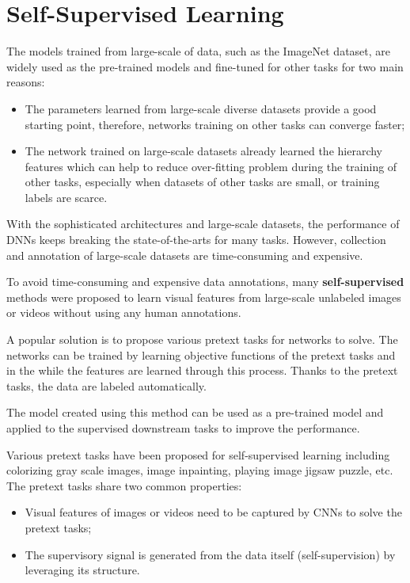 \chapter{Self-Supervised Learning}
The models trained from large-scale of data, such as the ImageNet dataset, are
widely used as the pre-trained models and fine-tuned for other tasks for two main
reasons:
\begin{itemize}
      \item The parameters learned from large-scale diverse datasets provide a
            good starting point, therefore, networks training on other tasks can
            converge faster;
      \item The network trained on large-scale datasets already learned the hierarchy
            features which can help to reduce over-fitting problem during the
            training of other tasks, especially when datasets of other tasks are
            small, or training labels are scarce.
\end{itemize}

With the sophisticated architectures and large-scale datasets, the performance
of DNNs keeps breaking the state-of-the-arts for many tasks. However, collection
and annotation of large-scale datasets are time-consuming and expensive.

To avoid time-consuming and expensive data annotations, many \textbf{self-supervised}
methods were proposed to learn visual features from large-scale unlabeled images
or videos without using any human annotations.

A popular solution is to propose various pretext tasks for networks to solve. The
networks can be trained by learning objective functions of the pretext tasks and
in the while the features are learned through this process. Thanks to the pretext
tasks, the data are labeled automatically.

The model created using this method can be used as a pre-trained model and applied
to the supervised downstream tasks to improve the performance.

Various pretext tasks have been proposed for self-supervised learning including
colorizing gray scale images, image inpainting, playing image jigsaw puzzle, etc.
The pretext tasks share two common properties:

\begin{itemize}
      \item Visual features of images or videos need to be captured by CNNs to
            solve the pretext tasks;
      \item The supervisory signal is generated from the data itself (self-supervision)
            by leveraging its structure.
\end{itemize}

